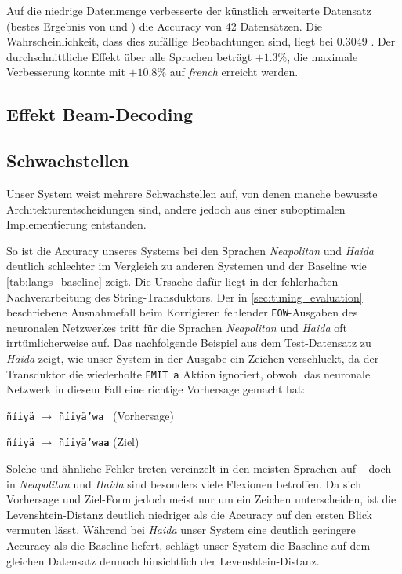 \documentclass[a4paper]{article}
\newcommand{\lang}[1]{\textit{#1}}
\newcommand{\action}[1]{\texttt{#1}}
\begin{document}
Auf die niedrige Datenmenge verbesserte der künstlich erweiterte Datensatz (bestes Ergebnis von  und ) die Accuracy von 42 Datensätzen. Die Wahrscheinlichkeit, dass dies zufällige Beobachtungen sind, liegt bei $0.3049$ \citep{biostat:zar}. Der durchschnittliche Effekt über alle Sprachen beträgt $+1.3\%$, die maximale Verbesserung konnte mit $+10.8\%$ auf \lang{french} erreicht werden.

\subsection{Effekt Beam-Decoding}
\label{sec:beam-results}

\subsection{Schwachstellen}
\label{sec:schwachstellen}
Unser System weist mehrere Schwachstellen auf, von denen manche bewusste Architekturentscheidungen sind, andere jedoch aus einer suboptimalen Implementierung entstanden.

So ist die Accuracy unseres Systems bei den Sprachen \lang{Neapolitan} und \lang{Haida} deutlich schlechter im Vergleich zu anderen Systemen und der Baseline wie \autoref{tab:langs_baseline} zeigt.
Die Ursache dafür liegt in der fehlerhaften Nachverarbeitung des String-Transduktors.
Der in \autoref{sec:tuning_evaluation} beschriebene Ausnahmefall beim Korrigieren fehlender \action{EOW}-Ausgaben des neuronalen Netzwerkes tritt für die Sprachen \lang{Neapolitan} und \lang{Haida} oft irrtümlicherweise auf.
Das nachfolgende Beispiel aus dem Test-Datensatz zu \lang{Haida} zeigt, wie unser System in der Ausgabe ein Zeichen verschluckt, da der Transduktor die wiederholte \action{EMIT a} Aktion ignoriert, obwohl das neuronale Netzwerk in diesem Fall eine richtige Vorhersage gemacht hat:
\begin{compactitem}
	\item \texttt{ñíiyä} $\to$ \texttt{ñíiyä'wa\ } (Vorhersage)
    \item \texttt{ñíiyä} $\to$ \texttt{ñíiyä'wa\textbf{a}} (Ziel)
\end{compactitem}
Solche und ähnliche Fehler treten vereinzelt in den meisten Sprachen auf -- doch in \lang{Neapolitan} und \lang{Haida} sind besonders viele Flexionen betroffen.
Da sich Vorhersage und Ziel-Form jedoch meist nur um ein Zeichen unterscheiden, ist die Levenshtein-Distanz deutlich niedriger als die Accuracy auf den ersten Blick vermuten lässt.
Während bei \lang{Haida} unser System eine deutlich geringere Accuracy als die Baseline liefert, schlägt unser System die Baseline auf dem gleichen Datensatz dennoch hinsichtlich der Levenshtein-Distanz.
\end{document}

